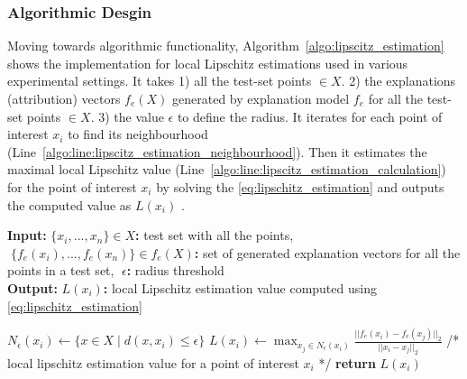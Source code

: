 \documentclass[english]{tktltiki2}
\theoremstyle{definition}
\theoremstyle{remark}
\newcommand{\multicommentsymbolstart}{/*}
\newcommand{\multicommentsymbolend}{*/}
\newcommand{\MultiLineComment}[2][\algorithmicindent]{\Statex \hspace{#1}\multicommentsymbolstart{} #2 \multicommentsymbolend{}}
\newcommand{\onespace}{\;}
\begin{document}
\subsubsection{Algorithmic Desgin}\label{sec:algorithmic_desgin} %
Moving towards algorithmic functionality, Algorithm~\ref{algo:lipscitz_estimation} shows the implementation for local Lipschitz estimations used in various experimental settings. It takes 1) all the test-set points $ \in X$. 2) the explanations (attribution) vectors $f_e(X)$ generated by explanation model $f_e$  for all the test-set points $\in X$. 3) the value $\epsilon$ to define the radius. It iterates for each point of interest $x_i$ to find its neighbourhood (Line~\ref{algo:line:lipscitz_estimation_neighbourhood}). Then it estimates the maximal local Lipschitz value (Line~\ref{algo:line:lipscitz_estimation_calculation}) for the point of interest $x_i$ by solving the \eqref{eq:lipschitz_estimation} and outputs the computed value as $L(x_i)$ .

\begin{algorithm}[H]
	\caption{$LipschitzEstimations(X,\onespace f_e(X),\onespace \epsilon)$}
	\label{algo:lipscitz_estimation}
	\hspace*{\algorithmicindent} \textbf{Input}\textbf{:} $\{x_i,...,x_n\} \in X$\textbf{:} test set with all the points, $\onespace \{f_e(x_i),...,f_e(x_n)\} \in f_e(X)$\textbf{:} set of generated explanation vectors for all the points in a test set, $\onespace \epsilon$\textbf{:} radius threshold \\
	\hspace*{\algorithmicindent} \textbf{Output}\textbf{:} $L(x_i)$\textbf{:} local Lipschitz estimation value computed using \eqref{eq:lipschitz_estimation}
	\begin{algorithmic}[1]
		\State \label{algo:line:lipscitz_estimation_neighbourhood} $N_\epsilon(x_i)\leftarrow \{x\in X\mid d(x,x_i)\le \epsilon\}$ \Comment {\eqref{eq:neighbourhood}}
		\State \label{algo:line:lipscitz_estimation_calculation} $L(x_i) \gets \operatorname*{max}_{x_j \in N_\epsilon(x_i)} \frac{||f_e(x_i) - f_e(x_j)||_2}{||x_i - x_j||_2}$ \Comment {\eqref{eq:lipschitz_estimation}}
		\EndFor
		\MultiLineComment[0\dimexpr\algorithmicindent]{local lipschitz estimation value for a point of interest $x_i$}
		\State \textbf{return} $L(x_i)$
	\end{algorithmic}
\end{algorithm}
\end{document}
